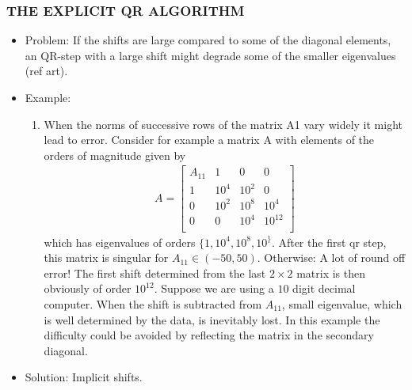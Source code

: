 \documentclass[a4paper,8pt]{beamer} %
\newcommand{\smatrix}[1]{\left[\begin{matrix} #1 \end{matrix}\right]}
\begin{document}
\begin{frame}
	\frametitle{THE EXPLICIT QR ALGORITHM}
\begin{itemize}
	\item Problem: If the shifts are large compared to some of the diagonal elements, 
				an QR-step with a large shift might degrade some of the smaller eigenvalues (ref art).
	\item Example:
		\begin{enumerate}
			\item
				When the norms of successive rows of the matrix A1 vary widely it might lead to error. 
				Consider for example a matrix A with elements of the orders of
				magnitude given by
				\begin{align}
					A= \smatrix{
						A_{11}&1&0&0\\
						1&10^{4}&10^{2}&0\\
						0&10^{2}&10^{8}&10^{4}\\
						0&0&10^{4}&10^{12}\\
					}
				\end{align}
				which has eigenvalues of orders $\{1,10^4,10^8,10^\}$. 
				After the first qr step, this matrix is singular for $A_{11}\in(-50,50)$.
				Otherwise: A lot of round off error!
				The first shift determined from the last $2\times 2$ matrix is then obviously of 
				order $10^{12}$. Suppose we are
				using a $10$ digit decimal computer. When the shift is subtracted from $A_{11}$,
				small eigenvalue, which is well determined by the data, is inevitably lost. In this example the
				difficulty could be avoided by reflecting the matrix in the secondary diagonal.
		\end{enumerate}
	\item Solution: Implicit shifts.
\end{itemize}
\end{frame}
\end{document}
